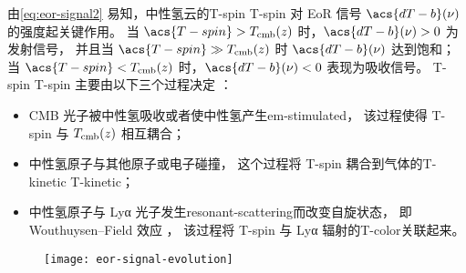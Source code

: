 由\autoref{eq:eor-signal2} 易知，中性氢云的\acl{T-spin} \acs{T-spin}
对 EoR 信号 $\acs{dT-b}(\nu)$ 的强度起关键作用。
当 $\acs{T-spin} > T_{\R{cmb}}(z)$ 时，$\acs{dT-b}(\nu) > 0$ 为发射信号，
并且当 $\acs{T-spin} \gg T_{\R{cmb}}(z)$ 时 $\acs{dT-b}(\nu)$ 达到饱和；
当 $\acs{T-spin} < T_{\R{cmb}}(z)$ 时，$\acs{dT-b}(\nu) < 0$ 表现为吸收信号。
\acl{T-spin} \acs{T-spin} 主要由以下三个过程决定 \cite{pritchard2012}：
\begin{itemize}
  \item CMB 光子被中性氢吸收或者使中性氢产生\ac{em-stimulated}，
    该过程使得 \acs{T-spin} 与 $T_{\mathrm{cmb}}(z)$ 相互耦合；
  \item 中性氢原子与其他原子或电子碰撞，
    这个过程将 \acs{T-spin} 耦合到气体的\acl{T-kinetic} \acs{T-kinetic}；
  \item 中性氢原子与 Lyα 光子发生\ac{resonant-scattering}而改变自旋状态，
    即 Wouthuysen--Field 效应 \cite{wouthuysen1952,field1958}，
    该过程将 \acs{T-spin} 与 Lyα 辐射的\ac{T-color}关联起来。
\end{itemize}

\begin{figure}[htp]
  \centering
  \texttt{[image: eor-signal-evolution]}
  \label{fig:eor-signal-evo}
\end{figure}

